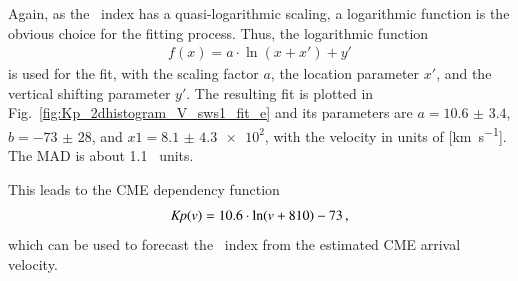 Again, as the \Kp~index has a quasi-logarithmic scaling, a logarithmic function is the obvious choice for the fitting process. Thus, the logarithmic function
\begin{align}
	f(x) = a \cdot \ln\left(x + x'\right) + y'	\label{eq:log_offset_fit_function}
\end{align}
is used for the fit, with the scaling factor $a$, the location parameter $x'$, and the vertical shifting parameter $y'$. The resulting fit is plotted in Fig.~\ref{fig:Kp_2dhistogram_V_sws1_fit_e} and its parameters are $a = \num{10.6(34)}$, $b = \num{-73(28)}$, and $x1 = \num{8.1(43)e2}$, with the velocity in units of [\si{\km\per\s}]. The MAD is about 1.1~\Kp{} units.
\begin{figure}
\end{figure}
This leads to the CME dependency function
\begin{align}
	\textit{Kp}(v) = 10.6 \cdot \ln(v + 810) - 73	\,,	\label{eq:kpvsv_dependency_function}
\end{align}
which can be used to forecast the \Kp{}~index from the estimated CME arrival velocity.

